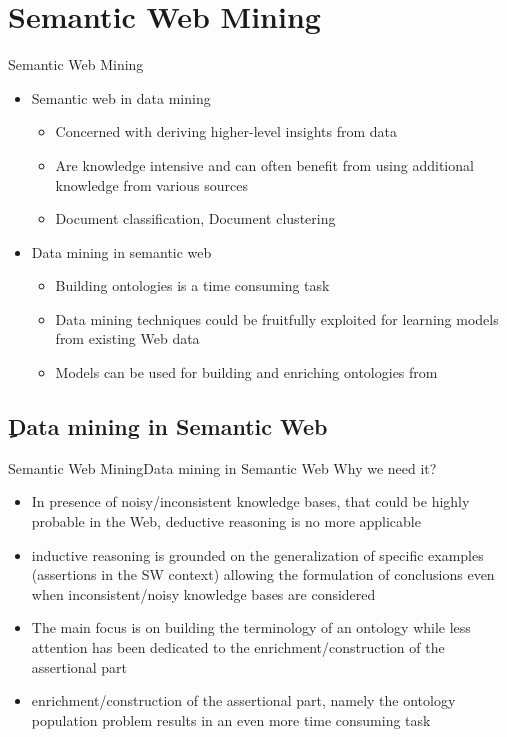 \documentclass[10pt]{beamer}
\begin{document}
\section{Semantic Web Mining}

\begin{frame}{Semantic Web Mining}
\begin{itemize}
	\item Semantic web in data mining \cite{ristoski2016semantic}
	\begin{itemize}
		\item Concerned with deriving higher-level insights from data
		\item Are knowledge intensive and can often benefit from using additional knowledge from various sources
		\item Document classification, Document clustering \cite{berendt2004roadmap}
	\end{itemize}
	\item Data mining in semantic web \cite{d2010inductive}
	\begin{itemize}
		\item Building ontologies is a time consuming task
		\item Data mining techniques could be fruitfully exploited for learning models from existing Web data
		\item Models can be used for building and enriching ontologies from
	\end{itemize}
\end{itemize}
\end{frame}

\subsection{ِData mining in Semantic Web}
\begin{frame}{Semantic Web Mining}{Data mining in Semantic Web}
	Why we need it? \cite{d2010inductive}
	 \begin{itemize} 
		\item In presence of noisy/inconsistent knowledge bases, that could be highly probable in  the Web, deductive reasoning is no more applicable 
		\item inductive reasoning is grounded on the generalization of specific examples (assertions in the SW context) allowing the formulation of conclusions even when inconsistent/noisy knowledge bases are considered
		\item The main focus is on   building the terminology of an ontology while less attention has been dedicated to the enrichment/construction of the assertional part
		\item enrichment/construction of the assertional part, namely the ontology population problem results in an even more time consuming task
	 \end{itemize}
\end{frame}
\end{document}
